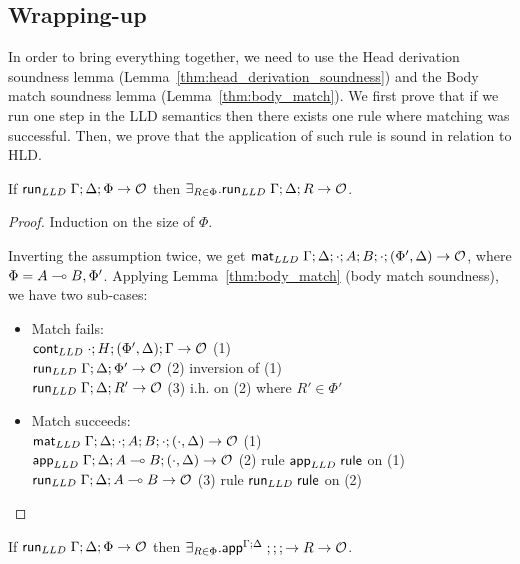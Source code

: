 \subsection{Wrapping-up}

In order to bring everything together, we need to use the Head derivation
soundness lemma (Lemma~\ref{thm:head_derivation_soundness}) and the Body match
soundness lemma (Lemma~\ref{thm:body_match}).  We first prove that if we run one
step in the LLD semantics then there exists one rule where matching was
successful. Then, we prove that the application of such rule is sound in
relation to HLD.

\begin{theorem}\label{thm:one_rule}
If $\mathsf{run}_{LLD} \; \Gamma; \Delta; \Phi \rightarrow \mathcal{O}$ then
$\exists_{R \in \Phi}. \mathsf{run}_{LLD} \; \Gamma; \Delta; R \rightarrow \mathcal{O}$.
\end{theorem}
\begin{proof}
Induction on the size of $\Phi$.

Inverting the assumption twice, we get $\mathsf{mat}_{LLD} \; \Gamma; \Delta; \cdot; A; B; \cdot;
(\Phi', \Delta) \rightarrow \mathcal{O}$, where $\Phi = A \multimap B, \Phi'$. Applying Lemma~\ref{thm:body_match} (body match soundness), we have two sub-cases:

\begin{itemize}[leftmargin=*]
   \item Match fails: \\ $\mathsf{cont}_{LLD} \; \cdot; H; (\Phi', \Delta); \Gamma \rightarrow
   \mathcal{O}$ \hfill (1)\\
   $\mathsf{run}_{LLD} \; \Gamma; \Delta; \Phi' \rightarrow \mathcal{O}$ \hfill (2) inversion of (1) \\
   $\mathsf{run}_{LLD} \; \Gamma; \Delta; R' \rightarrow \mathcal{O}$ \hfill (3) i.h. on (2) where $R' \in \Phi'$ \\
   \item Match succeeds: \\
   $\mathsf{mat}_{LLD} \; \Gamma; \Delta; \cdot; A; B; \cdot; (\cdot, \Delta) \rightarrow \mathcal{O}$ \hfill (1)\\
   $\mathsf{app}_{LLD} \; \Gamma; \Delta; A \multimap B; (\cdot, \Delta) \rightarrow \mathcal{O}$ \hfill (2) rule $\mathsf{app}_{LLD} \; \mathsf{rule}$ on (1) \\
   $\mathsf{run}_{LLD} \; \Gamma; \Delta; A \multimap B \rightarrow \mathcal{O}$ \hfill (3) rule $\mathsf{run}_{LLD} \; \mathsf{rule}$ on (2) \\
\end{itemize}
\end{proof}

\begin{theorem}[Soundness]\label{thm:soundness}
If $\mathsf{run}_{LLD} \; \Gamma; \Delta; \Phi \rightarrow \mathcal{O}$ then $\exists_{R \in \Phi}.
\mathsf{app}^{\Gamma ; \Delta} \; ; ; ; \rightarrow R \rightarrow \mathcal{O}$.
\end{theorem}

